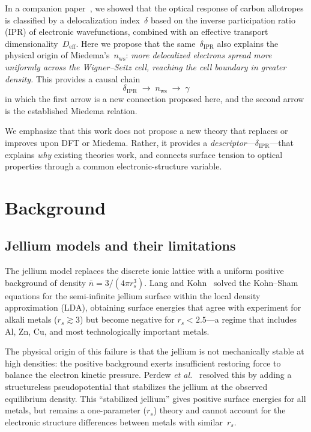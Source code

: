 \documentclass[twocolumn,showpacs,preprintnumbers,amsmath,amssymb,prb]{revtex4-2}
\begin{document}
In a companion paper~\cite{SentoOpticsPaper1}, we showed that
the optical response of carbon allotropes is classified by
a delocalization index~$\delta$ based on the inverse
participation ratio (IPR) of electronic wavefunctions,
combined with an effective transport
dimensionality~$D_\mathrm{eff}$.
Here we propose that the same~$\delta_\mathrm{IPR}$ also
explains the physical origin of Miedema's~$n_\mathrm{ws}$:
\emph{more delocalized electrons spread more uniformly across
the Wigner--Seitz cell, reaching the cell boundary in greater
density.}
This provides a causal chain
\begin{equation}
  \delta_\mathrm{IPR} \;\to\; n_\mathrm{ws} \;\to\; \gamma
  \label{eq:causal}
\end{equation}
in which the first arrow is a new connection proposed here,
and the second arrow is the established Miedema relation.

We emphasize that this work does not propose a new theory
that replaces or improves upon DFT or Miedema.
Rather, it provides a \emph{descriptor}---$\delta_\mathrm{IPR}$---that
explains \emph{why} existing theories work,
and connects surface tension to optical properties
through a common electronic-structure variable.


\section{Background}
\label{sec:background}

\subsection{Jellium models and their limitations}

The jellium model replaces the discrete ionic lattice with
a uniform positive background of density
$\bar{n} = 3/(4\pi r_s^3)$.
Lang and Kohn~\cite{LangKohn1970,LangKohn1971} solved the
Kohn--Sham equations for the semi-infinite jellium surface
within the local density approximation (LDA),
obtaining surface energies that agree with experiment
for alkali metals ($r_s \gtrsim 3$) but become negative
for $r_s < 2.5$---a regime that includes Al, Zn, Cu, and
most technologically important metals.

The physical origin of this failure is that
the jellium is not mechanically stable at high densities:
the positive background exerts insufficient restoring force
to balance the electron kinetic pressure.
Perdew \textit{et al.}~\cite{Perdew1990} resolved this by
adding a structureless pseudopotential that stabilizes the
jellium at the observed equilibrium density.
This ``stabilized jellium'' gives positive surface energies
for all metals, but remains a one-parameter ($r_s$) theory
and cannot account for the electronic structure differences
between metals with similar~$r_s$.
\end{document}

